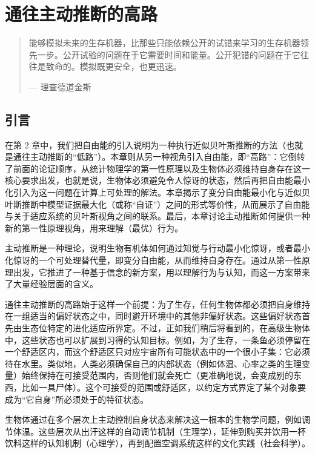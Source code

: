 \chapter{通往主动推断的高路}

\begin{quote}
能够模拟未来的生存机器，比那些只能依赖公开的试错来学习的生存机器领先一步。公开试验的问题在于它需要时间和能量。公开犯错的问题在于它往往是致命的。模拟既更安全，也更迅速。

\hfill --- 理查德\textperiodcentered 道金斯
\end{quote}

\section{引言}

在第 2 章中，我们把自由能的引入说明为一种执行近似贝叶斯推断的方法（也就是通往主动推断的“低路”）。本章则从另一种视角引入自由能，即“高路”：它倒转了前面的论证顺序，从统计物理学的第一性原理以及生物体必须维持自身存在这一核心要求出发，也就是说，生物体必须避免令人惊讶的状态，然后再把自由能最小化引入为这一问题在计算上可处理的解法。本章揭示了变分自由能最小化与近似贝叶斯推断中模型证据最大化（或称“自证”）之间的形式等价性，从而展示了自由能与关于适应系统的贝叶斯视角之间的联系。最后，本章讨论主动推断如何提供一种新的第一性原理视角，用来理解（最优）行为。

主动推断是一种理论，说明生物有机体如何通过知觉与行动最小化惊讶，或者最小化惊讶的一个可处理替代量，即变分自由能，从而维持自身存在。通过从第一性原理出发，它推进了一种基于信念的新方案，用以理解行为与认知，而这一方案带来了大量经验层面的含义。

通往主动推断的高路始于这样一个前提：为了生存，任何生物体都必须把自身维持在一组适当的偏好状态之中，同时避开环境中的其他非偏好状态。这些偏好状态首先由生态位特定的进化适应所界定。不过，正如我们稍后将看到的，在高级生物体中，这些状态也可以扩展到习得的认知目标。例如，为了生存，一条鱼必须停留在一个舒适区内，而这个舒适区只对应宇宙所有可能状态中的一个很小子集：它必须待在水里。类似地，人类必须确保自己的内部状态（例如体温、心率之类的生理变量）始终保持在可接受范围内，否则他们就会死亡（更准确地说，会变成别的东西，比如一具尸体）。这个可接受的范围或舒适区，以约定方式界定了某个对象要成为“它自身”所必须处于的特征状态。

生物体通过在多个层次上主动控制自身状态来解决这一根本的生物学问题，例如调节体温。这些层次从出汗这样的自动调节机制（生理学），延伸到购买并饮用一杯饮料这样的认知机制（心理学），再到配置空调系统这样的文化实践（社会科学）。

